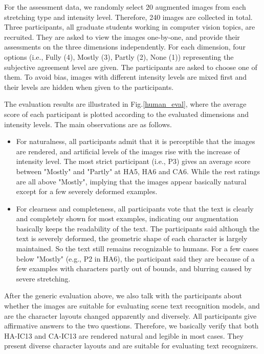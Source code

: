 For the assessment data, we randomly select 20 augmented images from each stretching type and intensity level. Therefore, 240 images are collected in total. Three participants, all graduate students working in computer vision topics, are recruited. They are asked to view the images one-by-one, and provide their assessments on the three dimensions independently. For each dimension, four options (i.e., Fully (4), Mostly (3), Partly (2), None (1)) representing the subjective agreement level are given. The participants are asked to choose one of them. To avoid bias, images with different intensity levels are mixed first and their levels are hidden when given to the participants. 

The evaluation results are illustrated in Fig.\ref{human_eval}, where the average score of each participant is plotted according to the evaluated dimensions and intensity levels. The main observations are as follows. 
\begin{itemize}
    \item For naturalness, all participants admit that it is perceptible that the images are rendered, and artificial levels of the images rise with the increase of intensity level. The most strict participant (i.e., P3) gives an average score between "Mostly" and "Partly" at HA5, HA6 and CA6. While the rest ratings are all above "Mostly", implying that the images appear basically natural except for a few severely deformed examples.   
    \item For clearness and completeness, all participants vote that the text is clearly and completely shown for most examples, indicating our augmentation basically keeps the readability of the text. The participants said although the text is severely deformed, the geometric shape of each character is largely maintained. So the text still remains recognizable to humans. For a few cases below "Mostly" (e.g., P2 in HA6), the participant said they are because of a few examples with characters partly out of bounds, and blurring caused by severe stretching.
\end{itemize}

After the generic evaluation above, we also talk with the participants about whether the images are suitable for evaluating scene text recognition models, and are the character layouts changed apparently and diversely. All participants give affirmative answers to the two questions. Therefore, we basically verify that both HA-IC13 and CA-IC13 are rendered natural and legible in most cases. They present diverse character layouts and are suitable for evaluating text recognizers.


